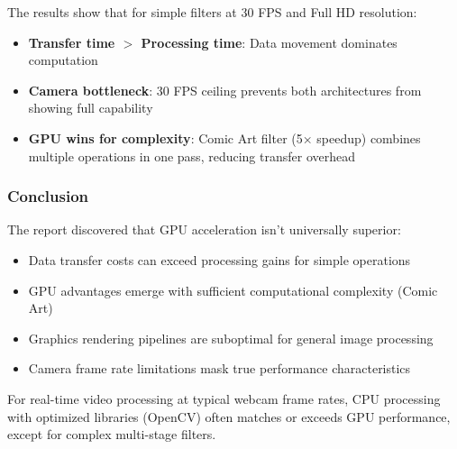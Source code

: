\documentclass[12pt,a4paper]{article}
\begin{document}
The results show that for simple filters at 30 FPS and Full HD resolution:
\begin{itemize}
    \item \textbf{Transfer time $>$ Processing time}: Data movement dominates computation
    \item \textbf{Camera bottleneck}: 30 FPS ceiling prevents both architectures from showing full capability
    \item \textbf{GPU wins for complexity}: Comic Art filter (5× speedup) combines multiple operations in one pass, reducing transfer overhead
\end{itemize}

\subsubsection{Conclusion}
The report discovered that GPU acceleration isn't universally superior:
\begin{itemize}
    \item Data transfer costs can exceed processing gains for simple operations
    \item GPU advantages emerge with sufficient computational complexity (Comic Art)
    \item Graphics rendering pipelines are suboptimal for general image processing
    \item Camera frame rate limitations mask true performance characteristics
\end{itemize}

For real-time video processing at typical webcam frame rates, CPU processing with optimized libraries (OpenCV) often matches or exceeds GPU performance, except for complex multi-stage filters.
\end{document}
